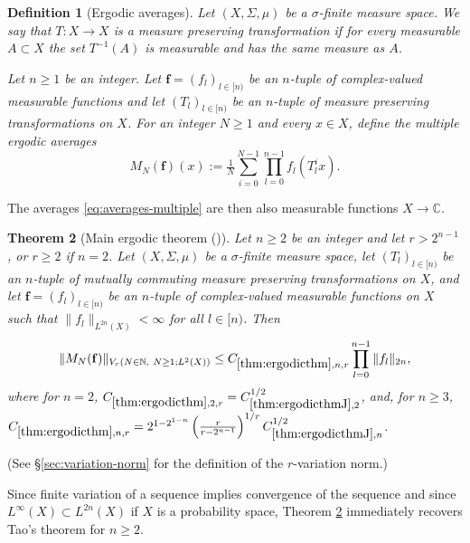 \documentclass[12pt,reqno]{amsart}
\newcommand{\auto}{{({\tiny\faCar})}}
\theoremstyle{plain}
\newtheorem{theorem}{Theorem}[section]
\newtheorem{definition}[theorem]{Definition}
\numberwithin{equation}{section}
\theoremstyle{remark}
\newcommand{\using}[1]{}
\newcommand{\N}{{\mathbb N}}
\newcommand{\C}{{\mathbb C}}
\begin{document}
\begin{definition}[Ergodic averages]\label{ergodic averages}
Let $(X,\Sigma,\mu)$ be a $\sigma$-finite measure space. We say that $T: X \to X$ is a measure preserving transformation if for every measurable $A\subset X$ the set $T^{-1}(A)$ is measurable and has the
same measure as $A$.

Let $n\geq 1$ be an integer. Let $\mathbf{f}=(f_l)_{l\in [n)}$ be an $n$-tuple of complex-valued measurable functions  and let $(T_l)_{l\in [n)}$ be an $n$-tuple of measure preserving transformations on $X$. For an integer $N\geq 1$ and every $x\in X$, define the multiple ergodic averages
\begin{equation}\label{eq:averages-multiple}
M_{N}(\mathbf{f})(x) := \tfrac{1}{N}\sum_{i=0}^{N-1} \prod_{l=0}^{n-1} f_l(T_l^i x).
\end{equation}
\end{definition}


The averages \eqref{eq:averages-multiple} are then also measurable functions $X\to \C$.

\begin{theorem}[Main ergodic theorem \auto]\label{thm:ergodicthm}\using{thm:ergodicthmJ}\using{jump estimates imply variation}
Let $n\ge 2$ be an integer and let $r>2^{n-1}$, or $r\ge 2$ if $n=2$. Let $(X,\Sigma,\mu)$ be a $\sigma$-finite measure space, let $(T_l)_{l\in [n)}$ be an $n$-tuple of mutually commuting measure preserving transformations on $X$, and let $\mathbf{f}=(f_l)_{l\in [n)}$ be an $n$-tuple of complex-valued measurable functions on $X$ such that $\|f_l\|_{L^{2n}(X)}<\infty$ for all $l\in[n)$. Then
\begin{equation}\label{main ergodic variation estimate}
 \| M_{N} (\mathbf{f}) \|_{V_{r}(N\in\N,\ N\ge1; L^2(X))}
\le C_{\ref{thm:ergodicthm},n,r}
 \prod_{l=0}^{n-1} \|f_l\|_{2n},
\end{equation}
where for $n=2$,
$C_{\ref{thm:ergodicthm},2,r}=C_{\ref{thm:ergodicthmJ},2}^{1/2}$,\label{main ergodic theorem constant}
and, for $n\ge3$,
$C_{\ref{thm:ergodicthm},n,r}=2^{1-2^{1-n}}\left(\tfrac{r}{r-2^{n-1}}\right)^{1/r}C_{\ref{thm:ergodicthmJ},n}^{1/2}$.\label{auto:main-ergodic-theorem-constant-higher-rank}
\end{theorem}
(See \S \ref{sec:variation-norm} for the definition of the $r$-variation norm.)

Since finite variation of a sequence implies convergence of the sequence and since $L^\infty(X)\subset L^{2n}(X)$ if $X$ is a probability space, Theorem \ref{thm:ergodicthm} immediately recovers Tao's theorem  \cite[Theorem 1.1]{Tao07} for $n\ge 2$.
\end{document}
